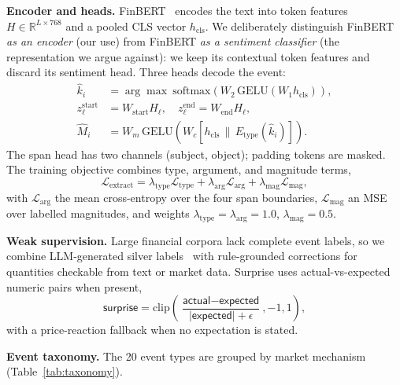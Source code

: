 \documentclass[sigconf,nonacm]{acmart}
\begin{document}
\textbf{Encoder and heads.} FinBERT~\cite{finbert} encodes the text into
token features $H\in\mathbb{R}^{L\times768}$ and a pooled CLS vector
$h_{\mathrm{cls}}$. We deliberately distinguish FinBERT \emph{as an
encoder} (our use) from FinBERT \emph{as a sentiment classifier} (the
representation we argue against): we keep its contextual token features
and discard its sentiment head. Three heads decode the event:
\begin{align}
\hat{k}_i &= \arg\max\ \mathrm{softmax}\!\left(W_2\,\mathrm{GELU}(W_1 h_{\mathrm{cls}})\right),\\
z_\ell^{\mathrm{start}} &= W_{\mathrm{start}}H_\ell,\quad
z_\ell^{\mathrm{end}}    = W_{\mathrm{end}}H_\ell,\\
\hat{M}_i &= W_m\,\mathrm{GELU}\!\left(W_c[h_{\mathrm{cls}}\,\|\,E_{\mathrm{type}}(\hat{k}_i)]\right).
\end{align}
The span head has two channels (subject, object); padding tokens are
masked. The training objective combines type, argument, and magnitude
terms,
\begin{equation}
\mathcal{L}_{\text{extract}}=
\lambda_{\mathrm{type}}\mathcal{L}_{\mathrm{type}}
+\lambda_{\mathrm{arg}}\mathcal{L}_{\mathrm{arg}}
+\lambda_{\mathrm{mag}}\mathcal{L}_{\mathrm{mag}},
\end{equation}
with $\mathcal{L}_{\mathrm{arg}}$ the mean cross-entropy over the four
span boundaries, $\mathcal{L}_{\mathrm{mag}}$ an MSE over labelled
magnitudes, and weights
$\lambda_{\mathrm{type}}=\lambda_{\mathrm{arg}}=1.0$,
$\lambda_{\mathrm{mag}}=0.5$.

\textbf{Weak supervision.} Large financial corpora lack complete event
labels, so we combine LLM-generated silver labels~\cite{gpt4} with
rule-grounded corrections for quantities checkable from text or market
data. Surprise uses actual-vs-expected numeric pairs when present,
\begin{equation}
\textsf{surprise}=\mathrm{clip}\!\left(\frac{\textsf{actual}-\textsf{expected}}{|\textsf{expected}|+\epsilon},-1,1\right),
\end{equation}
with a price-reaction fallback when no expectation is stated.

\textbf{Event taxonomy.} The 20 event types are grouped by market
mechanism (Table~\ref{tab:taxonomy}).
\end{document}
